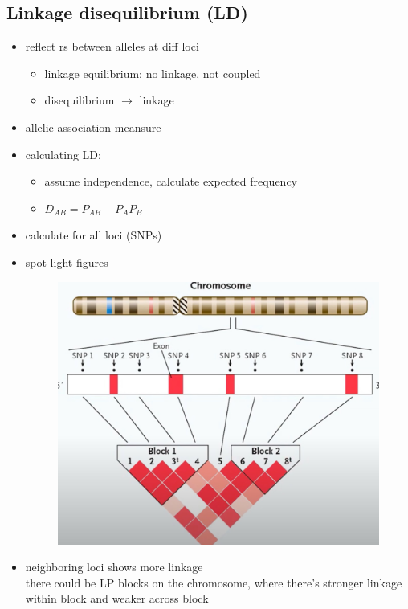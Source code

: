\documentclass[font=12pt]{article}
\begin{document}
\subsection{Linkage disequilibrium (LD)}
\begin{itemize}
	\item reflect rs between alleles at diff loci
	\begin{itemize}
		\item linkage equilibrium: no linkage, not coupled
		\item disequilibrium $ \rightarrow $ linkage
	\end{itemize}
	\item {} allelic association meansure
	\item calculating LD:
	\begin{itemize}
		\item assume independence, calculate expected frequency
		\item $ D_{AB} = P_{AB} - P_A P_B $
	\end{itemize}
	\item calculate for all loci (SNPs)
	\item spot-light figures\begin{figure}[h!]
		\centering
		\includegraphics[scale = 0.2]{"chromosome spotlight"}
		\label{fig:chromosome-spotlight}
	\end{figure}
	\item neighboring loci shows more linkage\\
	there could be LP blocks on the chromosome, where there's stronger linkage within block and weaker across block\\

\end{itemize}
\end{document}
